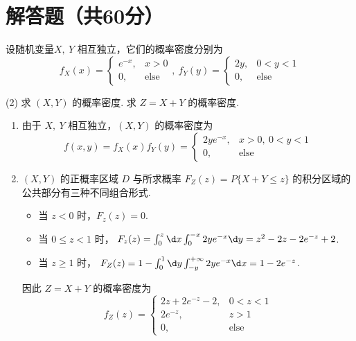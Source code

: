 \section{解答题（共60分）}

\begin{problem}[本题12分]
  设随机变量$X,~ Y$ 相互独立，它们的概率密度分别为
  \[
    f_X(x) =
    \begin{cases}
      e^{-x}, & x > 0\\
      0,      & \text{else}
    \end{cases},~
    f_Y(y) = 
    \begin{cases}
      2y, & 0 < y < 1\\
      0,  & \text{else}
    \end{cases}
  \]
  \begin{tasks}[ label = \arabic*. ](2)
    \task 求 $(X,Y)$ 的概率密度.
    \task 求 $Z = X + Y$ 的概率密度.
  \end{tasks}
\end{problem}
\scratch[18ex]
\begin{solution}\leavevmode
  \begin{enumerate}
    \item 由于 $X,~ Y$ 相互独立，$(X,Y)$ 的概率密度为
    \[
      f(x,y) = f_X(x) f_Y(y) =
        \begin{cases}
          2ye^{-x}, & x > 0,~ 0 < y < 1\\
          0,        & \text {else}
        \end{cases}
    \]
    \item $(X,Y)$ 的正概率区域 $D$ 与所求概率
    $F_Z(z) = P\{X + Y \leq z\}$ 的积分区域的公共部分有三种不同组合形式.
    \begin{itemize}
      \item 当 $z < 0$ 时，$F_z(z) = 0$.
      \item 当 $0 \leq z < 1$ 时，
      $F_z(z) = \int_0^z \d x \int_0^{-x} 2ye^{-x} \d y
              = z^2 - 2z - 2e^{-z} + 2$.
      \item 当 $z \geq 1$ 时，
      $F_Z(z) = 1 - \int_0^1 \d y \int_{-y}^{+\infty} 2ye^{-x} \d x
              = 1 - 2e^{-z}$.
    \end{itemize}
    因此 $Z = X + Y$ 的概率密度为
    \[
      f_Z(z) =
      \begin{cases}
        2 z + 2 e^{-z} - 2, & 0 < z < 1\\
        2 e^{-z},           & z > 1\\
        0,                  & \text{else}
      \end{cases}
    \]
  \end{enumerate}
\end{solution}

